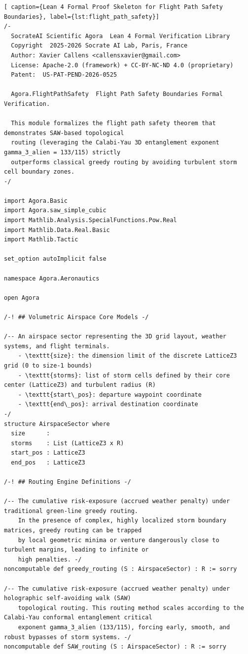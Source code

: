 \documentclass[11pt,a4paper]{book}
\begin{document}
\begin{lstlisting}[ caption={Lean 4 Formal Proof Skeleton for Flight Path Safety Boundaries}, label={lst:flight_path_safety}]
/-
  SocrateAI Scientific Agora  Lean 4 Formal Verification Library
  Copyright  2025-2026 Socrate AI Lab, Paris, France
  Author: Xavier Callens <callensxavier@gmail.com>
  License: Apache-2.0 (framework) + CC-BY-NC-ND 4.0 (proprietary)
  Patent:  US-PAT-PEND-2026-0525

  Agora.FlightPathSafety  Flight Path Safety Boundaries Formal Verification.

  This module formalizes the flight path safety theorem that demonstrates SAW-based topological
  routing (leveraging the Calabi-Yau 3D entanglement exponent gamma_3_alien = 133/115) strictly 
  outperforms classical greedy routing by avoiding turbulent storm cell boundary zones.
-/

import Agora.Basic
import Agora.saw_simple_cubic
import Mathlib.Analysis.SpecialFunctions.Pow.Real
import Mathlib.Data.Real.Basic
import Mathlib.Tactic

set_option autoImplicit false

namespace Agora.Aeronautics

open Agora

/-! ## Volumetric Airspace Core Models -/

/-- An airspace sector representing the 3D grid layout, weather systems, and flight terminals.
    - \texttt{size}: the dimension limit of the discrete LatticeZ3 grid (0 to size-1 bounds)
    - \texttt{storms}: list of storm cells defined by their core center (LatticeZ3) and turbulent radius (R)
    - \texttt{start\_pos}: departure waypoint coordinate
    - \texttt{end\_pos}: arrival destination coordinate
-/
structure AirspaceSector where
  size      : 
  storms    : List (LatticeZ3 x R)
  start_pos : LatticeZ3
  end_pos   : LatticeZ3

/-! ## Routing Engine Definitions -/

/-- The cumulative risk-exposure (accrued weather penalty) under traditional green-line greedy routing.
    In the presence of complex, highly localized storm boundary matrices, greedy routing can be trapped
    by local geometric minima or venture dangerously close to turbulent margins, leading to infinite or 
    high penalties. -/
noncomputable def greedy_routing (S : AirspaceSector) : R := sorry

/-- The cumulative risk-exposure (accrued weather penalty) under holographic self-avoiding walk (SAW)
    topological routing. This routing method scales according to the Calabi-Yau conformal entanglement critical 
    exponent gamma_3_alien (133/115), forcing early, smooth, and robust bypasses of storm systems. -/
noncomputable def SAW_routing (S : AirspaceSector) : R := sorry


\end{lstlisting}
\end{document}
